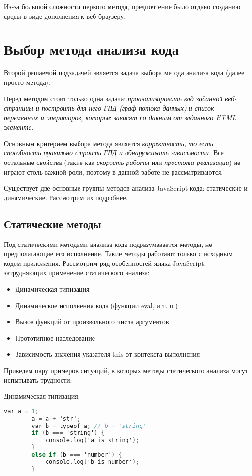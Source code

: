	Из-за большой сложности первого метода, предпочтение было отдано созданию среды в виде дополнения к веб-браузеру.

\section{Выбор метода анализа кода}

Второй решаемой подзадачей является задача выбора метода анализа кода (далее просто метода). 

\bigskip
Перед методом стоит только одна задача: \textit{проанализировать код заданной веб-страницы и построить для него ГПД (граф потока данных) и список переменных и операторов, которые зависят по данным от заданного HTML элемента.}

\bigskip
Основным критерием выбора метода является \textit{корректность, то есть способность правильно строить ГПД и обнаруживать зависимости.} Все остальные свойства (такие как \textit{скорость работы} или \textit{простота реализации}) не играют столь важной роли, поэтому в данной работе не рассматриваются.

\bigskip
Существует две основные группы методов анализа JavaScript кода: статические и динамические. Рассмотрим их подробнее.

\subsection{Статические методы}
	Под статическими методами анализа кода подразумевается методы, не предполагающие его исполнение. Такие методы работают только с исходным кодом приложения. Рассмотрим ряд особенностей языка JavaScript, затрудняющих применение статического анализа:

	\bigskip
	\begin{itemize}
		\item Динамическая типизация
		\item Динамическое исполнения кода (функции eval, и т. п.)
		\item Вызов функций от произвольного числа аргументов
		\item Прототипное наследование
		\item Зависимость значения указателя this от контекста выполнения
	\end{itemize}
	\bigskip

	Приведем пару примеров ситуаций, в которых методы статического анализа могут испытывать трудности:


	\bigskip
	Динамическая типизация:
	\begin{lstlisting}[language=C]
		var a = 1;
		a = a + 'str';
		var b = typeof a; // b = 'string'
		if (b === 'string') {
			console.log('a is string');
		}
		else if (b === 'number') {
			console.log('b is number');
		}
	\end{lstlisting}


